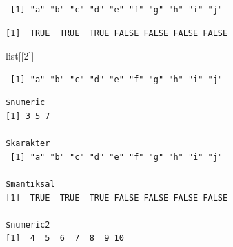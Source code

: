 \documentclass[
  letterpaper,
  DIV=11,
  numbers=noendperiod]{scrreprt}
\newenvironment{Shaded}{\begin{snugshade}}{\end{snugshade}}
\newcommand{\CommentTok}[1]{\textcolor[rgb]{0.37,0.37,0.37}{#1}}
\newcommand{\ConstantTok}[1]{\textcolor[rgb]{0.56,0.35,0.01}{#1}}
\newcommand{\DecValTok}[1]{\textcolor[rgb]{0.68,0.00,0.00}{#1}}
\newcommand{\FunctionTok}[1]{\textcolor[rgb]{0.28,0.35,0.67}{#1}}
\newcommand{\NormalTok}[1]{\textcolor[rgb]{0.00,0.23,0.31}{#1}}
\newcommand{\OtherTok}[1]{\textcolor[rgb]{0.00,0.23,0.31}{#1}}
\newcommand{\SpecialCharTok}[1]{\textcolor[rgb]{0.37,0.37,0.37}{#1}}
\begin{document}
\begin{verbatim}
 [1] "a" "b" "c" "d" "e" "f" "g" "h" "i" "j"
\end{verbatim}

\begin{Shaded}
\end{Shaded}

\begin{verbatim}
[1]  TRUE  TRUE  TRUE FALSE FALSE FALSE FALSE
\end{verbatim}

\begin{Shaded}
\begin{Highlighting}[]
\NormalTok{list[[}\DecValTok{2}\NormalTok{]]}
\end{Highlighting}
\end{Shaded}

\begin{verbatim}
 [1] "a" "b" "c" "d" "e" "f" "g" "h" "i" "j"
\end{verbatim}

\begin{Shaded}
\end{Shaded}

\begin{verbatim}
$numeric
[1] 3 5 7

$karakter
 [1] "a" "b" "c" "d" "e" "f" "g" "h" "i" "j"

$mantıksal
[1]  TRUE  TRUE  TRUE FALSE FALSE FALSE FALSE

$numeric2
[1]  4  5  6  7  8  9 10
\end{verbatim}

\begin{Shaded}
\end{Shaded}
\end{document}
